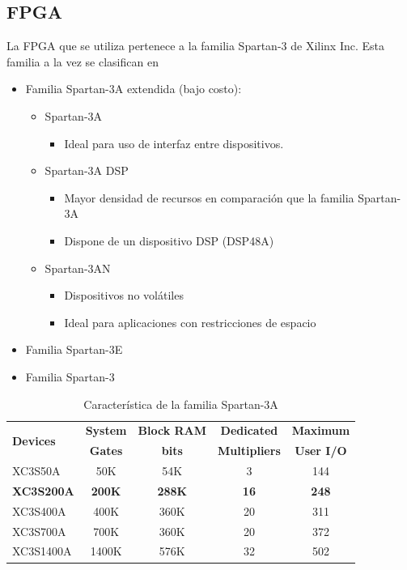 \documentclass[conference]{IEEEtran}
\begin{document}
\lipsum[7-9]
\subsection{FPGA}
\label{sec:fpga}
La FPGA que se utiliza pertenece a la familia Spartan-3 de Xilinx Inc. Esta familia a la vez se clasifican en

\begin{itemize}
\item Familia Spartan-3A extendida (bajo costo):
  \begin{itemize}
  \item Spartan-3A
    \begin{itemize}
    \item Ideal para uso de interfaz entre dispositivos.
    \end{itemize}
  \item Spartan-3A DSP
    \begin{itemize}
    \item Mayor densidad de recursos en comparación que la familia Spartan-3A
    \item Dispone de un dispositivo DSP (DSP48A)
    \end{itemize}
  \item Spartan-3AN
    \begin{itemize}
    \item Dispositivos no volátiles
    \item Ideal para aplicaciones con restricciones de espacio
    \end{itemize}
  \end{itemize}
\item Familia Spartan-3E
\item Familia Spartan-3
\end{itemize}

\lipsum[10-13]

\begin{table}[!t]
\renewcommand{\arraystretch}{1.3}
\caption{Característica de la familia Spartan-3A}
\label{tab:char-fpga}
\centering
\begin{tabular}{|l|c|c|c|c|}
\hline
\multirow{2}{*}{\textbf{Devices}} & \textbf{System} & \textbf{Block RAM} & \textbf{Dedicated} &  \textbf{Maximum} \\
 & \textbf{Gates} & \textbf{bits} & \textbf{Multipliers} & \textbf{User I/O} \\
\hline
XC3S50A & 50K & 54K & 3 & 144 \\
\hline
\textbf{XC3S200A} & \textbf{200K} & \textbf{288K} & \textbf{16} & \textbf{248} \\
\hline
XC3S400A & 400K & 360K & 20 & 311 \\
\hline
XC3S700A & 700K & 360K & 20 & 372 \\
\hline
XC3S1400A & 1400K & 576K & 32 & 502 \\
\hline
\end{tabular}
\end{table}
\end{document}
